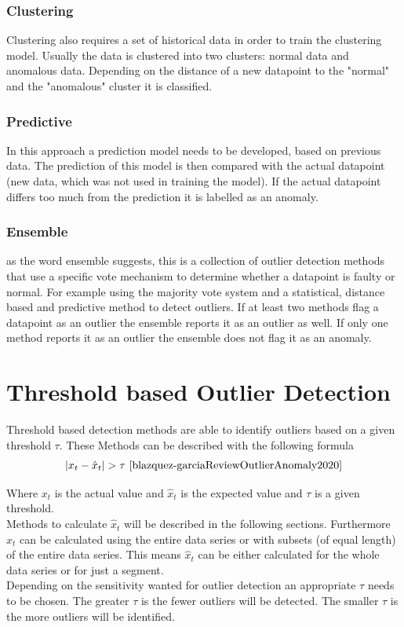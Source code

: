 \subsubsection{Clustering}
Clustering also requires a set of historical data in order to train the clustering model. Usually the data is clustered into two clusters: normal data and anomalous data. Depending on the distance of a new datapoint to the "normal" and the "anomalous" cluster it is classified.
\cite{cookAnomalyDetectionIoT2020, giannoniAnomalyDetectionModels2018, chandolaAnomalyDetectionSurvey2009}
\subsubsection{Predictive}
In this approach a prediction model needs to be developed, based on previous data. The prediction of this model is then compared with the actual datapoint (new data, which was not used in training the model). If the actual datapoint differs too much from the prediction it is labelled as an anomaly. \cite{cookAnomalyDetectionIoT2020, giannoniAnomalyDetectionModels2018}


\subsubsection{Ensemble}
as the word ensemble suggests, this is a collection of outlier detection methods that use a specific vote mechanism to determine whether a datapoint is faulty or normal. For example using the majority vote system and a statistical, distance based and predictive method to detect outliers. If at least two methods flag a datapoint as an outlier the ensemble reports it as an outlier as well. If only one method reports it as an outlier the ensemble does not flag it as an anomaly.
\cite{cookAnomalyDetectionIoT2020}

\section{Threshold based Outlier Detection}\label{section:threshold-based-outlier-detection}
Threshold based detection methods are able to identify outliers based on a given threshold $\tau$. These Methods can be described with the following formula
\begin{equation}
  |x_t - \hat{x}_t | > \tau \text{ \cite{blazquez-garciaReviewOutlierAnomaly2020}}
\end{equation}

Where $x_t$ is the actual value and $\hat{x}_t$ is the expected value and $\tau$ is a given threshold.\\
Methods to calculate $\hat{x}_t$ will be described in the following sections. Furthermore $\hat{x}_t$ can be calculated using the entire data series or with subsets (of equal length) of the entire data series. This means $\hat{x}_t$ can be either calculated for the whole data series or for just a segment.\\
Depending on the sensitivity wanted for outlier detection an appropriate $\tau$ needs to be chosen. The greater $\tau$ is the fewer outliers will be detected. The smaller $\tau$ is the more outliers will be identified.  \cite{blazquez-garciaReviewOutlierAnomaly2020}

